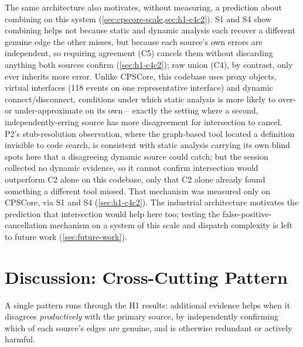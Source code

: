 The same architecture also motivates, without measuring, a prediction
about combining on this system (\cref{sec:cpscore-scale,sec:h1-c4c2}).
S1 and S4 show combining helps not because static and dynamic analysis
each recover a different genuine edge the other misses, but because
each source's own errors are independent, so requiring agreement (C5)
cancels them without discarding anything both sources confirm
(\cref{sec:h1-c4c2}); raw union (C4), by contrast, only ever inherits
more error. Unlike CPSCore, this codebase uses proxy objects, virtual
interfaces (118 events on one representative interface) and dynamic
connect/disconnect, conditions under which static analysis is more
likely to over- or under-approximate on its own -- exactly the setting
where a second, independently-erring source has more disagreement for
intersection to cancel. P2's stub-resolution observation, where the
graph-based tool located a definition invisible to code search, is
consistent with static analysis carrying its own blind spots here that a
disagreeing dynamic source could catch; but the session collected no
dynamic evidence, so it cannot confirm intersection would outperform C2
alone on this codebase, only that C2 alone already found something a
different tool missed. That mechanism was measured only on CPSCore, via
S1 and S4 (\cref{sec:h1-c4c2}). The industrial architecture motivates
the prediction that intersection would help here too; testing the
false-positive-cancellation mechanism on a system of this scale and
dispatch complexity is left to future work (\cref{sec:future-work}).

\section{Discussion: Cross-Cutting Pattern}\label{sec:discussion}

A single pattern runs through the H1 results: additional evidence helps
when it disagrees \emph{productively} with the primary source, by
independently confirming which of each source's edges are genuine, and
is otherwise redundant or actively harmful.

